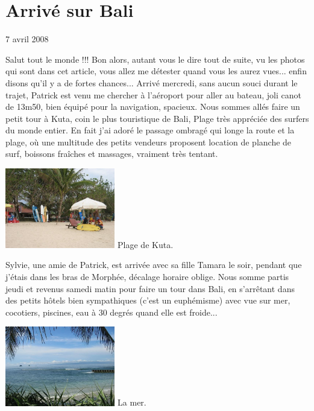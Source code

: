 \section{Arrivé sur Bali}

7 avril 2008

\begin{multicols}{2}

Salut tout le monde !!! Bon alors, autant vous le dire tout de suite, vu les photos qui sont dans cet article, vous allez me détester quand vous les aurez vues... enfin disons qu'il y a de fortes chances... Arrivé mercredi, sans aucun souci durant le trajet, Patrick est venu me chercher à l'aéroport pour aller au bateau, joli canot de 13m50, bien équipé pour la navigation, spacieux. Nous sommes allés faire un petit tour à Kuta, coin le plus touristique de Bali, Plage très appréciée des surfers du monde entier. En fait j'ai adoré le passage ombragé qui longe la route et la plage, où une multitude des petits vendeurs proposent location de planche de surf, boissons fraîches et massages, vraiment très tentant.

\hspace*{-0.65cm}
\includegraphics[width=4.8cm]{articles/Arrivee-sur-bali/1207567562ikVd.jpg}
Plage de Kuta.

Sylvie, une amie de Patrick, est arrivée avec sa fille Tamara le soir, pendant que j'étais dans les bras de Morphée, décalage horaire oblige. Nous somme partis jeudi et revenus samedi matin pour faire un tour dans Bali, en s'arrêtant dans des petits hôtels bien sympathiques (c'est un euphémisme) avec vue sur mer, cocotiers, piscines, eau à 30 degrés quand elle est froide...

\hspace*{-0.65cm}
\includegraphics[width=4.8cm]{articles/Arrivee-sur-bali/1207567561DqJk.jpg}
La mer.


\end{multicols}

